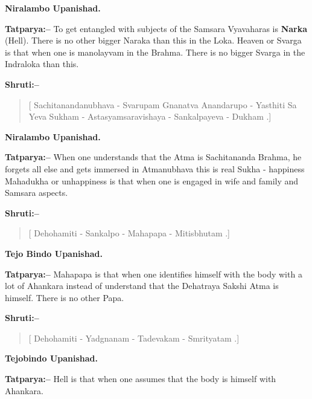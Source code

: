 \begin{flushright}
\textbf{Niralambo Upanishad.}
\end{flushright}

\textbf{Tatparya:–} To get entangled with subjects of the Samsara Vyavaharas is \textbf{Narka} (Hell). There is no other bigger Naraka than this in the Loka. Heaven or Svarga is that when one is manolayvam in the Brahma. There is no bigger Svarga in the Indraloka than this.

\textbf{Shruti:–}

\begin{verse}
[ Sachitanandanubhava - Svarupam Gnanatva Ananda\break rupo - Yasthiti  Sa Yeva Sukham - Astasyamsaravi\break shaya - Sankalpayeva - Dukham .]
\end{verse}

\begin{flushright}
\textbf{Niralambo Upanishad.}
\end{flushright}

\textbf{Tatparya:–} When one understands that the Atma is Sachitananda Brahma, he forgets all else and gets immersed in Atmanubhava this is real Sukha - happiness Mahadukha or unhappiness is that when one is engaged in wife and family and Samsara aspects.

\newpage

\textbf{Shruti:–}

\begin{verse}
[ Dehohamiti - Sankalpo - Mahapapa - Mitisbhutam .]
\end{verse}

\begin{flushright}
\textbf{Tejo Bindo Upanishad.}
\end{flushright}

\textbf{Tatparya:–} Mahapapa is that when one identifies himself with the body with a lot of Ahankara instead of understand that the Dehatraya Sakshi Atma is himself. There is no other Papa.

\textbf{Shruti:–}

\begin{verse}
[ Dehohamiti - Yadgnanam - Tadevakam - Smrityatam .]
\end{verse}

\begin{flushright}
\textbf{Tejobindo Upanishad.}
\end{flushright}

\textbf{Tatparya:–} Hell is that when one assumes that the body is himself with Ahankara.

